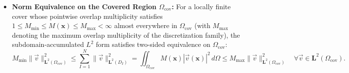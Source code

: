 \documentclass[VANCOUVER,Times1COL]{WileyNJD-v5}
\begin{document}
\begin{itemize}
          with $C_1, C_2$ depending only on $\alpha_s, C_A,$ and $C_u$. By the triangle inequality across any overlap $\Omega_s^{IJ} \equiv D_I \cap D_J \ne \emptyset$, the inter-stencil discrepancy is governed locally by $h_{IJ} \equiv \max(h_I, h_J)$. Under the additional \textbf{quasi-uniformity hypothesis} that local spacings and stencil support radii remain comparable to $h_{\mathrm{char}}$ across the refinement family,
          \begin{equation}
              c_0 h_{\mathrm{char}} \le h_I \le r_u^I \le C_0 h_{\mathrm{char}} \qquad \forall I \in \{1, \dots, N\},
              \label{eq:quasi_uniformity_hypothesis}
          \end{equation}
          with refinement-independent constants $0 < c_0 \le C_0 < \infty$ (whereas on non-quasi-uniform clouds with strongly clustered or rarefied regions, $h_{\mathrm{char}}$ below is replaced by the local scale $h_{IJ} = \max(h_I, h_J)$), the overlap jumps scale globally as:
          \begin{align}
              \|\vec{E}_{I,h} - \vec{E}_{J,h}\|_{\boldsymbol{L}^2(\Omega_s^{IJ})} & \le C_3 h_{\mathrm{char}}^2 \|\vec{E}\|_{\boldsymbol{H}^2(\Omega_u^I \cup \Omega_u^J)}, \label{eq:stencil_jump_L2} \\
              \|\operatorname{curl}\vec{E}_{I,h} - \operatorname{curl}\vec{E}_{J,h}\|_{\boldsymbol{L}^2(\Omega_s^{IJ})} & \le C_4 h_{\mathrm{char}} \|\vec{E}\|_{\boldsymbol{H}^2(\Omega_u^I \cup \Omega_u^J)}. \label{eq:stencil_jump_curl}
          \end{align}
    \item \textbf{Norm Equivalence on the Covered Region $\Omega_{\mathrm{cov}}$:} For a locally finite cover whose pointwise overlap multiplicity satisfies $1 \le M_{\min} \le M(\mathbf{x}) \le M_{\max} < \infty$ almost everywhere in $\Omega_{\mathrm{cov}}$ (with $M_{\max}$ denoting the maximum overlap multiplicity of the discretization family), the subdomain-accumulated $L^2$ form satisfies two-sided equivalence on $\Omega_{\mathrm{cov}}$:
          \begin{equation}
              M_{\min} \|\vec{v}\|_{\boldsymbol{L}^2(\Omega_{\mathrm{cov}})}^2 \le \sum_{I=1}^N \|\vec{v}\|_{\boldsymbol{L}^2(D_I)}^2 = \iint_{\Omega_{\mathrm{cov}}} M(\mathbf{x}) |\vec{v}(\mathbf{x})|^2 \, d\Omega \le M_{\max} \|\vec{v}\|_{\boldsymbol{L}^2(\Omega_{\mathrm{cov}})}^2 \quad \forall \vec{v} \in \boldsymbol{L}^2(\Omega_{\mathrm{cov}}).
              \label{eq:norm_equivalence_multiplicity}
          \end{equation}

\end{itemize}
\end{document}
